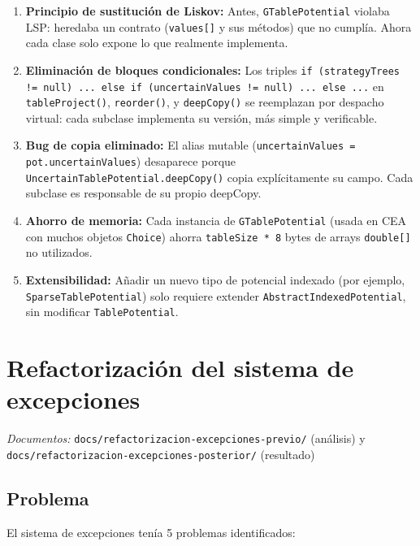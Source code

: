 \documentclass[11pt,a4paper]{article}
\begin{document}
\begin{enumerate}
  \item \textbf{Principio de sustitución de Liskov:} Antes, \texttt{GTablePotential} violaba LSP: heredaba un contrato (\texttt{values[]} y sus métodos) que no cumplía. Ahora cada clase solo expone lo que realmente implementa.
  \item \textbf{Eliminación de bloques condicionales:} Los triples \texttt{if (strategyTrees != null) ... else if (uncertainValues != null) ... else ...} en \texttt{tableProject()}, \texttt{reorder()}, y \texttt{deepCopy()} se reemplazan por despacho virtual: cada subclase implementa su versión, más simple y verificable.
  \item \textbf{Bug de copia eliminado:} El alias mutable (\texttt{uncertainValues = pot.uncertainValues}) desaparece porque \texttt{UncertainTablePotential.deepCopy()} copia explícitamente su campo. Cada subclase es responsable de su propio deepCopy.
  \item \textbf{Ahorro de memoria:} Cada instancia de \texttt{GTablePotential} (usada en CEA con muchos objetos \texttt{Choice}) ahorra \texttt{tableSize * 8} bytes de arrays \texttt{double[]} no utilizados.
  \item \textbf{Extensibilidad:} Añadir un nuevo tipo de potencial indexado (por ejemplo, \texttt{SparseTablePotential}) solo requiere extender \texttt{AbstractIndexedPotential}, sin modificar \texttt{TablePotential}.
\end{enumerate}

\section{Refactorización del sistema de excepciones}
\label{sec:excepciones}

\noindent\textit{Documentos:} \texttt{docs/refactorizacion-excepciones-previo/} (análisis) y \texttt{docs/refactorizacion-excepciones-posterior/} (resultado)

\subsection{Problema}

El sistema de excepciones tenía 5 problemas identificados:
\end{document}
